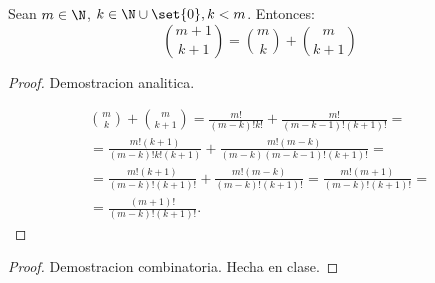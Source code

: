 \begin{theorem}
	Sean \(m \in \N \), \(k \in \N \cup \set{0}, k < m \). Entonces:
	\[
		\binom{m+1 }{k + 1 } = \binom{m }{k } + \binom{m }{k + 1 }
	\]
\end{theorem}
\begin{proof}
	Demostracion analitica.

	\begin{multline*}
		\binom{m }{k }+ \binom{m }{k + 1} = \frac{m! }{(m-k)! k! } + \frac{m! }{(m-k-1)! (k+1)! } = \\
		= \frac{m! (k+1)}{(m-k)!k! (k+1)} + \frac{m! (m-k)}{(m-k)(m-k-1)!(k+1)! } = \\
		= \frac{m!(k+1)}{(m-k)!(k+1)!} + \frac{m!(m-k)}{(m-k)!(k+1)!} = \frac{m!(m+1)}{(m-k)!(k+1)!} = \\ = \boxed{\frac{(m+1)!}{(m-k)!(k+1)!}}.
	\end{multline*}
\end{proof}
\begin{proof}
	Demostracion combinatoria. Hecha en clase.
\end{proof}

